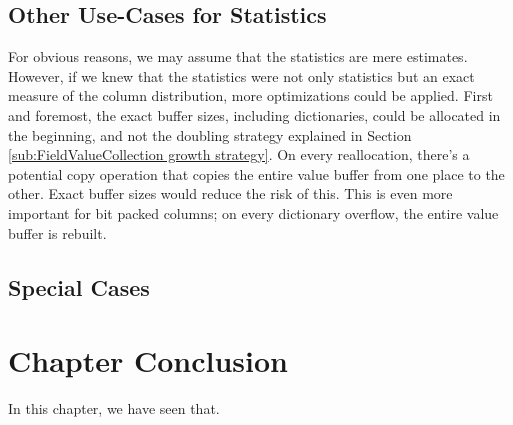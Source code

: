 \subsection{Other Use-Cases for Statistics}
\label{sub:Other Use-Cases for Statistics}
For obvious reasons, we may assume that the statistics are mere estimates. However, if we knew that the statistics were not only statistics but an exact measure of the column distribution, more optimizations could be applied. First and foremost, the exact buffer sizes, including dictionaries, could be allocated in the beginning, and not the doubling strategy explained in Section \ref{sub:FieldValueCollection growth strategy}. On every reallocation, there's a potential copy operation that copies the entire value buffer from one place to the other. Exact buffer sizes would reduce the risk of this. This is even more important for bit packed columns; on every dictionary overflow, the entire value buffer is rebuilt. 

\subsection{Special Cases}
\label{sub:Special Cases}


\section{Chapter Conclusion}
\label{sec:Chapter Conclusion}

In this chapter, we have seen that.



